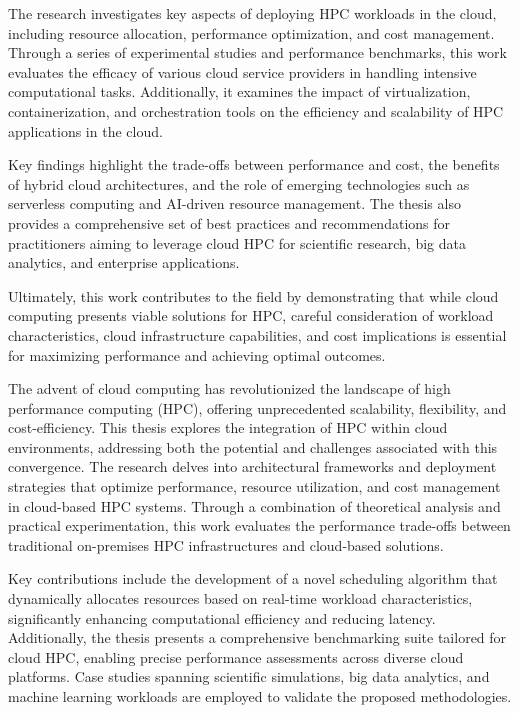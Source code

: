 The research investigates key aspects of deploying HPC workloads in the cloud, including resource allocation, performance optimization, and cost management. Through a series of experimental studies and performance benchmarks, this work evaluates the efficacy of various cloud service providers in handling intensive computational tasks. Additionally, it examines the impact of virtualization, containerization, and orchestration tools on the efficiency and scalability of HPC applications in the cloud.

Key findings highlight the trade-offs between performance and cost, the benefits of hybrid cloud architectures, and the role of emerging technologies such as serverless computing and AI-driven resource management. The thesis also provides a comprehensive set of best practices and recommendations for practitioners aiming to leverage cloud HPC for scientific research, big data analytics, and enterprise applications.

Ultimately, this work contributes to the field by demonstrating that while cloud computing presents viable solutions for HPC, careful consideration of workload characteristics, cloud infrastructure capabilities, and cost implications is essential for maximizing performance and achieving optimal outcomes.

The advent of cloud computing has revolutionized the landscape of high performance computing (HPC), offering unprecedented scalability, flexibility, and cost-efficiency. This thesis explores the integration of HPC within cloud environments, addressing both the potential and challenges associated with this convergence. The research delves into architectural frameworks and deployment strategies that optimize performance, resource utilization, and cost management in cloud-based HPC systems. Through a combination of theoretical analysis and practical experimentation, this work evaluates the performance trade-offs between traditional on-premises HPC infrastructures and cloud-based solutions.

Key contributions include the development of a novel scheduling algorithm that dynamically allocates resources based on real-time workload characteristics, significantly enhancing computational efficiency and reducing latency. Additionally, the thesis presents a comprehensive benchmarking suite tailored for cloud HPC, enabling precise performance assessments across diverse cloud platforms. Case studies spanning scientific simulations, big data analytics, and machine learning workloads are employed to validate the proposed methodologies.

